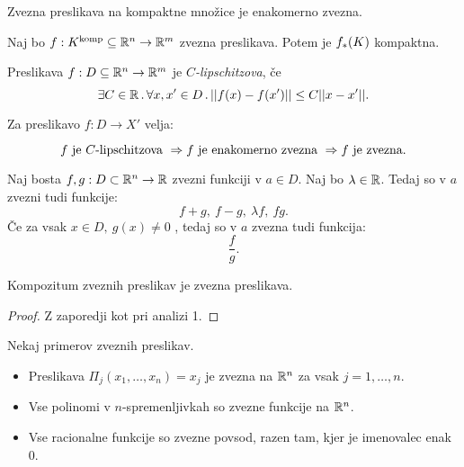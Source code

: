 \begin{trditev}
    Zvezna preslikava na kompaktne množice je enakomerno zvezna.
\end{trditev}

\begin{trditev}
    Naj bo $f: K^\text{komp} \subseteq \mathbb{R}^n \to \mathbb{R}^m$ zvezna preslikava. Potem je $f_{*}(K)$ kompaktna.
\end{trditev}

\begin{definicija}
    Preslikava $f: D \subseteq \mathbb{R}^n \to \mathbb{R}^m$ je \emph{$C$-lipschitzova}, če
    $$\exists C \in \mathbb{R} \,.\, \forall x, x' \in D \,.\, ||f(x) - f(x')|| \leq C ||x - x'||.$$
\end{definicija}

\begin{trditev}
    Za preslikavo $f: D \to X'$ velja:

    $$f \text{ je $C$-lipschitzova } \Rightarrow f \text{ je enakomerno zvezna } \Rightarrow f \text{ je zvezna}.$$
\end{trditev}

\begin{trditev}
    Naj bosta $f, g: D \subset \mathbb{R}^n \to \mathbb{R}$ zvezni funkciji v $a \in D$. Naj bo $\lambda \in \mathbb{R}$. Tedaj so v $a$ zvezni tudi funkcije:
    $$f+g, \ f-g, \ \lambda f, \ fg.$$
    Če za vsak $x \in D, \ g(x) \neq 0$ , tedaj so v $a$ zvezna tudi funkcija: 
    $$\frac{f}{g}.$$
\end{trditev}

\begin{trditev}
    Kompozitum zveznih preslikav je zvezna preslikava.
\end{trditev}

\begin{proof}
    Z zaporedji kot pri analizi 1.
\end{proof}

\begin{zgled}
    Nekaj primerov zveznih preslikav.
    \begin{itemize}
        \item Preslikava $\Pi_j(x_1, \ldots, x_n) = x_j$ je zvezna na $\mathbb{R}^n$ za vsak $j = 1, \ldots, n$.
        \item Vse polinomi v $n$-spremenljivkah so zvezne funkcije na $\mathbb{R}^n$.
        \item Vse racionalne funkcije so zvezne povsod, razen tam, kjer je imenovalec enak $0$.
    \end{itemize}
\end{zgled}


